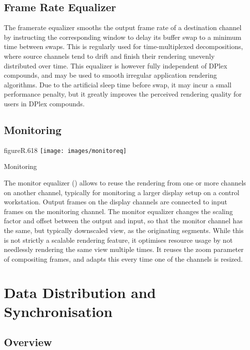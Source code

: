 \section{Frame Rate Equalizer}\label{sFramerateEq}

The framerate equalizer smooths the output frame rate of a destination channel
by instructing the corresponding window to delay its buffer swap to a minimum
time between swaps. This is regularly used for time-multiplexed decompositions,
where source channels tend to drift and finish their rendering unevenly
distributed over time. This equalizer is however fully independent of DPlex
compounds, and may be used to smooth irregular application rendering
algorithms. Due to the artificial sleep time before swap, it may incur a small
performance penalty, but it greatly improves the perceived rendering quality for
users in DPlex compounds.

\section{Monitoring}

\begin{wrapfloat}{figure}{R}{.618\textwidth}
  \texttt{[image: images/monitoreq]}
  \caption{\label{fmonitor}Monitoring}
\end{wrapfloat}

The monitor equalizer () allows to reuse the rendering from one
or more channels on another channel, typically for monitoring a larger display
setup on a control workstation. Output frames on the display channels are
connected to input frames on the monitoring channel. The monitor equalizer
changes the scaling factor and offset between the output and input, so that the
monitor channel has the same, but typically downscaled view, as the originating
segments. While this is not strictly a scalable rendering feature, it optimises
resource usage by not needlessly rendering the same view multiple times. It
reuses the zoom parameter of compositing frames, and adapts this every time one
of the channels is resized.


\chapter{Data Distribution and Synchronisation}\label{sCollage}

\section{Overview}

